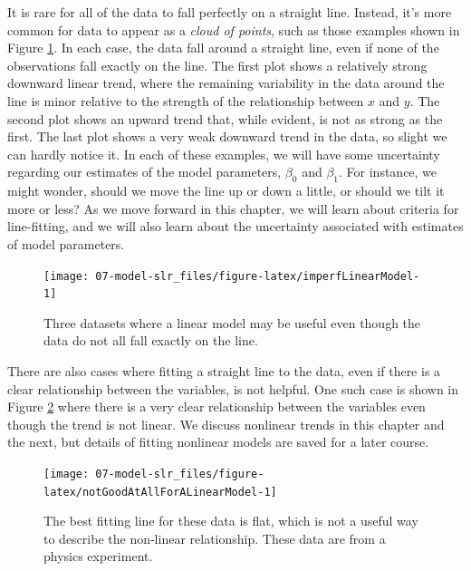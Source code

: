 \documentclass[
  10pt,
  openany]{book}
\begin{document}
It is rare for all of the data to fall perfectly on a straight line.
Instead, it's more common for data to appear as a \emph{cloud of points}, such as those examples shown in Figure \ref{fig:imperfLinearModel}.
In each case, the data fall around a straight line, even if none of the observations fall exactly on the line.
The first plot shows a relatively strong downward linear trend, where the remaining variability in the data around the line is minor relative to the strength of the relationship between \(x\) and \(y.\) The second plot shows an upward trend that, while evident, is not as strong as the first.
The last plot shows a very weak downward trend in the data, so slight we can hardly notice it.
In each of these examples, we will have some uncertainty regarding our estimates of the model parameters, \(\beta_0\) and \(\beta_1.\) For instance, we might wonder, should we move the line up or down a little, or should we tilt it more or less?
As we move forward in this chapter, we will learn about criteria for line-fitting, and we will also learn about the uncertainty associated with estimates of model parameters.

\begin{figure}[h]

{\centering \texttt{[image: 07-model-slr\_files/figure-latex/imperfLinearModel-1]} 

}

\caption{Three datasets where a linear model may be useful even though the data do not all fall exactly on the line.}\label{fig:imperfLinearModel}
\end{figure}

There are also cases where fitting a straight line to the data, even if there is a clear relationship between the variables, is not helpful.
One such case is shown in Figure \ref{fig:notGoodAtAllForALinearModel} where there is a very clear relationship between the variables even though the trend is not linear.
We discuss nonlinear trends in this chapter and the next, but details of fitting nonlinear models are saved for a later course.

\begin{figure}[h]

{\centering \texttt{[image: 07-model-slr\_files/figure-latex/notGoodAtAllForALinearModel-1]} 

}

\caption{The best fitting line for these data is flat, which is not a useful way to describe the non-linear relationship. These data are from a physics experiment.}\label{fig:notGoodAtAllForALinearModel}
\end{figure}
\end{document}
